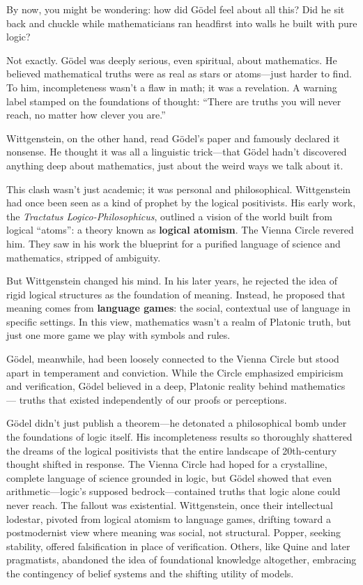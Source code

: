 By now, you might be wondering: how did Gödel feel about all this? Did he sit back and chuckle while mathematicians ran headfirst into walls he built with pure logic?

Not exactly. Gödel was deeply serious, even spiritual, about mathematics. He believed mathematical truths were as real as stars or atoms—just harder to find. To him, incompleteness wasn’t a flaw in math; it was a revelation. A warning label stamped on the foundations of thought: “There are truths you will never reach, no matter how clever you are.”

\noindent Wittgenstein, on the other hand, read Gödel’s paper and famously declared it nonsense. He thought it was all a linguistic trick—that Gödel hadn’t discovered anything deep about mathematics, just about the weird ways we talk about it.

\medskip

\noindent This clash wasn’t just academic; it was personal and philosophical. Wittgenstein had once been seen as a kind of prophet by the logical positivists. His early work, the \emph{Tractatus Logico-Philosophicus}, outlined a vision of the world built from logical ``atoms'': a theory known as \textbf{logical atomism}. The Vienna Circle revered him. They saw in his work the blueprint for a purified language of science and mathematics, stripped of ambiguity.

But Wittgenstein changed his mind. In his later years, he rejected the idea of rigid logical structures as the foundation of meaning. Instead, he proposed that meaning comes from \textbf{language games}: the social, contextual use of language in specific settings. In this view, mathematics wasn’t a realm of Platonic truth, but just one more game we play with symbols and rules.

Gödel, meanwhile, had been loosely connected to the Vienna Circle but stood apart in temperament and conviction. While the Circle emphasized empiricism and verification, Gödel believed in a deep, Platonic reality behind mathematics --- truths that existed independently of our proofs or perceptions.

Gödel didn’t just publish a theorem—he detonated a philosophical bomb under the foundations of logic itself. His incompleteness results so thoroughly shattered the dreams of the logical positivists that the entire landscape of 20th-century thought shifted in response. The Vienna Circle had hoped for a crystalline, complete language of science grounded in logic, but Gödel showed that even arithmetic—logic’s supposed bedrock—contained truths that logic alone could never reach. The fallout was existential. Wittgenstein, once their intellectual lodestar, pivoted from logical atomism to language games, drifting toward a postmodernist view where meaning was social, not structural. Popper, seeking stability, offered falsification in place of verification. Others, like Quine and later pragmatists, abandoned the idea of foundational knowledge altogether, embracing the contingency of belief systems and the shifting utility of models. 

